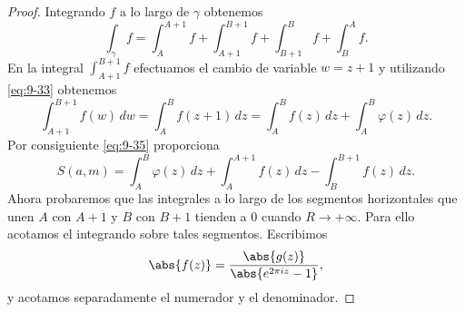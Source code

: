 \documentclass[12pt,a4paper]{book}
\begin{document}
\begin{proof}
        Integrando $f$ a lo largo de $\gamma$ obtenemos
        \begin{equation*}
            \int_{\gamma} f=\int_{A}^{A+1}f+\int_{A+1}^{B+1}f+\int_{B+1}^{B}f+\int_{B}^{A}f.
        \end{equation*}
        En la integral $\int_{A+1}^{B+1}f$ efectuamos el cambio de variable $w=z+1$ y
        utilizando \eqref{eq:9-33} obtenemos
        \begin{equation*}
            \int_{A+1}^{B+1}f(w)\,dw=\int_{A}^{B}f(z+1)\,dz=\int_{A}^{B}f(z)\,dz+\int_{A}^{B}\varphi(z)\,dz.
        \end{equation*}
        Por consiguiente \eqref{eq:9-35} proporciona
        \begin{equation}\label{eq:9-36}
            S(a,m)=\int_{A}^{B}\varphi(z)\,dz+\int_{A}^{A+1}f(z)\,dz-\int_{B}^{B+1}f(z)\,dz.
        \end{equation}
        Ahora probaremos que las integrales a lo largo de los segmentos horizontales que
        unen $A$ con $A+1$ y $B$ con $B+1$ tienden a 0 cuando $R\to+\infty$. Para ello
        acotamos el integrando sobre tales segmentos. Escribimos
        \begin{equation}\label{eq:9-37}
            \abs{f(z)}=\frac{\abs{g(z)}}{\abs{e^{2\pi iz}-1}},
        \end{equation}
        y acotamos separadamente el numerador y el denominador.


\end{proof}
\end{document}

